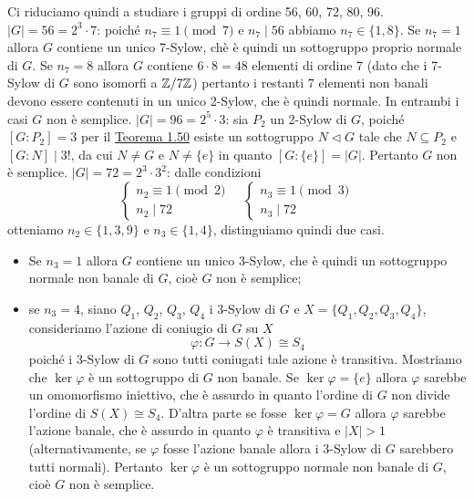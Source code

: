 \documentclass[11pt]{scrartcl}
\begin{document}
Ci riduciamo quindi a studiare i gruppi di ordine 56, 60, 72, 80, 96.
\newline\newline
\underline{$|G| = 56 = 2^3\cdot 7$}: poiché $n_7 \equiv 1 \pmod 7$ e $n_7 \mid 56$ abbiamo
$n_7 \in \{1, 8\}$. Se $n_7 = 1$ allora $G$ contiene un unico 7-Sylow, chè 
è quindi un sottogruppo proprio normale di $G$. Se $n_7 = 8$ allora $G$ contiene
$6\cdot8 = 48$ elementi di ordine 7 (dato che i 7-Sylow di $G$ sono isomorfi a $\mathbb{Z}/{7}\mathbb{Z}$)
pertanto i restanti $7$ elementi non banali devono essere contenuti in un 
unico 2-Sylow, che è quindi normale. In entrambi i casi $G$ non è semplice.
\newline\newline
\underline{$|G| = 96 = 2^5\cdot 3$}: sia $P_2$ un 2-Sylow di $G$, poiché 
$[G:P_2] = 3$ per il \hyperref[teorema3.0]{Teorema 1.50} esiste un sottogruppo
$N \triangleleft G$ tale che $N \subseteq P_2$ e $[G:N] \mid 3!$, da cui
$N \neq G$ e $N \neq \{e\}$ in quanto $[G:\{e\}] = |G|$. Pertanto $G$ non 
è semplice.
\newline\newline
\underline{$|G| = 72 = 2^3 \cdot 3^2$}: dalle condizioni 
\[
    \begin{cases}
        n_2 \equiv 1 \pmod 2\\
        n_2 \mid 72
    \end{cases}\quad
    \begin{cases}
        n_3 \equiv 1 \pmod 3\\
        n_3 \mid 72
    \end{cases}
\]
otteniamo $n_2 \in \{1, 3, 9\}$ e $n_3 \in \{1, 4\}$, distinguiamo quindi
due casi.
\begin{itemize}
    \item Se $n_3 = 1$ allora $G$ contiene un unico 3-Sylow, che è quindi un
    sottogruppo normale non banale di $G$, cioè $G$ non è semplice;
    \item se $n_3= 4$, siano $Q_1$, $Q_2$, $Q_3$, $Q_4$ i 3-Sylow di $G$ e 
    $X = \{Q_1, Q_2, Q_3, Q_4\}$, consideriamo l'azione di coniugio di $G$ su $X$
    \[
        \varphi: G\longrightarrow S(X) \cong S_4
    \]
    poiché i 3-Sylow di $G$ sono tutti coniugati tale azione è transitiva.
    Mostriamo che $\ker \varphi$ è un sottogruppo di $G$ non banale. Se $\ker\varphi
    = \{e\}$ allora $\varphi$ sarebbe un omomorfismo iniettivo, che è assurdo
    in quanto l'ordine di $G$ non divide l'ordine di $S(X) \cong S_4$. D'altra
    parte se fosse $\ker\varphi = G$ allora $\varphi$ sarebbe l'azione banale,
    che è assurdo in quanto $\varphi$ è transitiva e $|X| > 1$ (alternativamente,
    se $\varphi$ fosse l'azione banale allora i 3-Sylow di $G$ sarebbero tutti
    normali). Pertanto $\ker\varphi$ è un sottogruppo normale non banale di $G$,
    cioè $G$ non è semplice.
\end{itemize}
\end{document}
